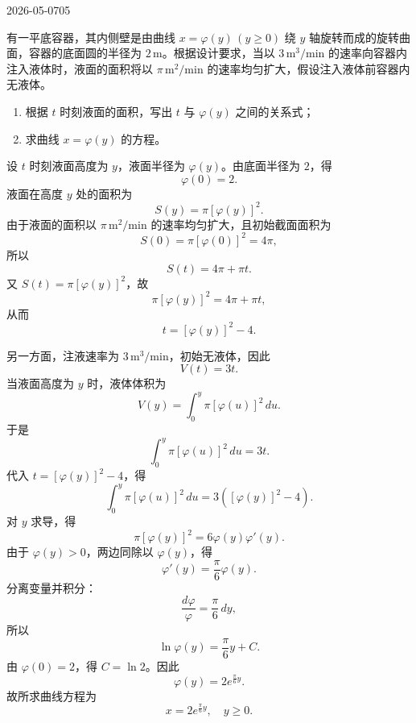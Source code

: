 \begin{mistake}{2026-05-07}{05}

\begin{problemcontent}
有一平底容器，其内侧壁是由曲线 \(x=\varphi(y)\,(y\ge 0)\) 绕 \(y\) 轴旋转而成的旋转曲面，容器的底面圆的半径为 \(2\,\mathrm m\)。根据设计要求，当以 \(3\,\mathrm{m^3/min}\) 的速率向容器内注入液体时，液面的面积将以 \(\pi\,\mathrm{m^2/min}\) 的速率均匀扩大，假设注入液体前容器内无液体。

\begin{enumerate}
  \item 根据 \(t\) 时刻液面的面积，写出 \(t\) 与 \(\varphi(y)\) 之间的关系式；
  \item 求曲线 \(x=\varphi(y)\) 的方程。
\end{enumerate}
\end{problemcontent}

\begin{solutioncontent}
设 \(t\) 时刻液面高度为 \(y\)，液面半径为 \(\varphi(y)\)。由底面半径为 \(2\)，得
\[
\varphi(0)=2.
\]
液面在高度 \(y\) 处的面积为
\[
S(y)=\pi[\varphi(y)]^2.
\]
由于液面的面积以 \(\pi\,\mathrm{m^2/min}\) 的速率均匀扩大，且初始截面面积为
\[
S(0)=\pi[\varphi(0)]^2=4\pi,
\]
所以
\[
S(t)=4\pi+\pi t.
\]
又 \(S(t)=\pi[\varphi(y)]^2\)，故
\[
\pi[\varphi(y)]^2=4\pi+\pi t,
\]
从而
\[
t=[\varphi(y)]^2-4.
\]

另一方面，注液速率为 \(3\,\mathrm{m^3/min}\)，初始无液体，因此
\[
V(t)=3t.
\]
当液面高度为 \(y\) 时，液体体积为
\[
V(y)=\int_0^y \pi[\varphi(u)]^2\,du.
\]
于是
\[
\int_0^y \pi[\varphi(u)]^2\,du=3t.
\]
代入 \(t=[\varphi(y)]^2-4\)，得
\[
\int_0^y \pi[\varphi(u)]^2\,du=3\left([\varphi(y)]^2-4\right).
\]
对 \(y\) 求导，得
\[
\pi[\varphi(y)]^2=6\varphi(y)\varphi'(y).
\]
由于 \(\varphi(y)>0\)，两边同除以 \(\varphi(y)\)，得
\[
\varphi'(y)=\frac{\pi}{6}\varphi(y).
\]
分离变量并积分：
\[
\frac{d\varphi}{\varphi}=\frac{\pi}{6}\,dy,
\]
所以
\[
\ln \varphi(y)=\frac{\pi}{6}y+C.
\]
由 \(\varphi(0)=2\)，得 \(C=\ln 2\)。因此
\[
\varphi(y)=2e^{\frac{\pi}{6}y}.
\]
故所求曲线方程为
\[
\boxed{x=2e^{\frac{\pi}{6}y},\quad y\ge 0.}
\]
\end{solutioncontent}


\end{mistake}
